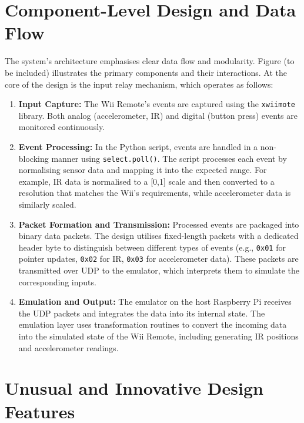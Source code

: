 \section{Component-Level Design and Data Flow}

The system’s architecture emphasises clear data flow and modularity. Figure%
(to be included) illustrates the primary components and their interactions. At the core of the design is the input relay mechanism, which operates as follows:

\begin{enumerate}
    \item \textbf{Input Capture:}
          The Wii Remote’s events are captured using the \texttt{xwiimote} library. Both analog (accelerometer, IR) and digital (button press) events are monitored continuously.

    \item \textbf{Event Processing:}
          In the Python script, events are handled in a non-blocking manner using \texttt{select.poll()}. The script processes each event by normalising sensor data and mapping it into the expected range. For example, IR data is normalised to a [0,1] scale and then converted to a resolution that matches the Wii’s requirements, while accelerometer data is similarly scaled.

    \item \textbf{Packet Formation and Transmission:}
          Processed events are packaged into binary data packets. The design utilises fixed-length packets with a dedicated header byte to distinguish between different types of events (e.g., \texttt{0x01} for pointer updates, \texttt{0x02} for IR, \texttt{0x03} for accelerometer data). These packets are transmitted over UDP to the emulator, which interprets them to simulate the corresponding inputs.

    \item \textbf{Emulation and Output:}
          The emulator on the host Raspberry Pi receives the UDP packets and integrates the data into its internal state. The emulation layer uses transformation routines to convert the incoming data into the simulated state of the Wii Remote, including generating IR positions and accelerometer readings.
\end{enumerate}

\section{Unusual and Innovative Design Features}

